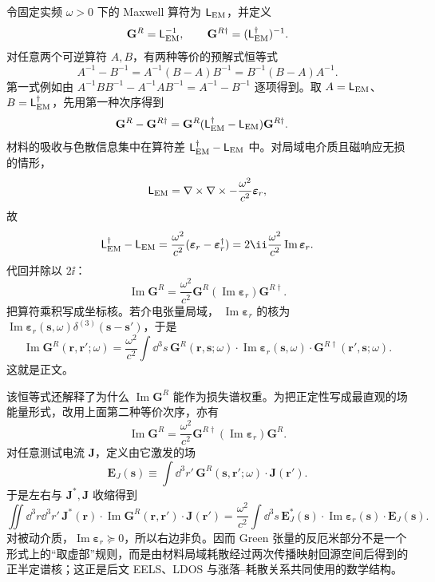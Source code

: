 \begin{derivation}
令固定实频 $\omega>0$ 下的 Maxwell 算符为 $\mathsf L_{\rm EM}$，并定义
\[
\mathbf G^R=\mathsf L_{\rm EM}^{-1},
\qquad
\mathbf G^{R\dagger}=(\mathsf L_{\rm EM}^{\dagger})^{-1}.
\]
对任意两个可逆算符 $A,B$，有两种等价的预解式恒等式
\[
A^{-1}-B^{-1}
=A^{-1}(B-A)B^{-1}
=B^{-1}(B-A)A^{-1}.
\]
第一式例如由
$A^{-1}BB^{-1}-A^{-1}AB^{-1}=A^{-1}-B^{-1}$ 逐项得到。取
$A=\mathsf L_{\rm EM}$、$B=\mathsf L_{\rm EM}^{\dagger}$，先用第一种次序得到
\begin{align*}
\mathbf G^R-\mathbf G^{R\dagger}
&=\mathbf G^R
(\mathsf L_{\rm EM}^{\dagger}-\mathsf L_{\rm EM})
\mathbf G^{R\dagger}.
\end{align*}
材料的吸收与色散信息集中在算符差 $\mathsf L_{\rm EM}^{\dagger}-\mathsf L_{\rm EM}$ 中。对局域电介质且磁响应无损的情形，
\[
\mathsf L_{\rm EM}
=\nabla\times\nabla\times
-\frac{\omega^2}{c^2}\boldsymbol\varepsilon_r,
\]
故
\[
\mathsf L_{\rm EM}^{\dagger}-\mathsf L_{\rm EM}
=\frac{\omega^2}{c^2}
(\boldsymbol\varepsilon_r-\boldsymbol\varepsilon_r^{\dagger})
=2\ii\frac{\omega^2}{c^2}
\operatorname{Im}\boldsymbol\varepsilon_r.
\]
代回并除以 $2\ii$：
\[
\operatorname{Im}\mathbf G^R
=\frac{\omega^2}{c^2}
\mathbf G^R
(\operatorname{Im}\boldsymbol\varepsilon_r)
\mathbf G^{R\dagger}.
\]
把算符乘积写成坐标核。若介电张量局域，
$\operatorname{Im}\boldsymbol\varepsilon_r$ 的核为
$\operatorname{Im}\boldsymbol\varepsilon_r(\mathbf s,\omega)
\delta^{(3)}(\mathbf s-\mathbf s')$，于是
\[
\boxed{
\operatorname{Im}\mathbf G^R(\mathbf r,\mathbf r';\omega)
=\frac{\omega^2}{c^2}\int\dd^3s\,
\mathbf G^R(\mathbf r,\mathbf s;\omega)
\cdot\operatorname{Im}\boldsymbol\varepsilon_r(\mathbf s,\omega)
\cdot\mathbf G^{R\dagger}(\mathbf r',\mathbf s;\omega)}.
\]
这就是正文。

该恒等式还解释了为什么 $\operatorname{Im}\mathbf G^R$ 能作为损失谱权重。为把正定性写成最直观的场能量形式，改用上面第二种等价次序，亦有
\[
\operatorname{Im}\mathbf G^R
=\frac{\omega^2}{c^2}
\mathbf G^{R\dagger}
(\operatorname{Im}\boldsymbol\varepsilon_r)
\mathbf G^R.
\]
对任意测试电流 $\mathbf J$，定义由它激发的场
\[
\mathbf E_J(\mathbf s)
\equiv\int\dd^3r'\,\mathbf G^R(\mathbf s,\mathbf r';\omega)\cdot\mathbf J(\mathbf r').
\]
于是左右与 $\mathbf J^*,\mathbf J$ 收缩得到
\[
\iint\dd^3r\dd^3r'\,
\mathbf J^*(\mathbf r)\cdot\operatorname{Im}\mathbf G^R(\mathbf r,\mathbf r')\cdot\mathbf J(\mathbf r')
=\frac{\omega^2}{c^2}\int\dd^3s\,
\mathbf E_J^*(\mathbf s)\cdot
\operatorname{Im}\boldsymbol\varepsilon_r(\mathbf s)\cdot\mathbf E_J(\mathbf s).
\]
对被动介质，$\operatorname{Im}\boldsymbol\varepsilon_r\succeq0$，所以右边非负。因而 Green 张量的反厄米部分不是一个形式上的“取虚部”规则，而是由材料局域耗散经过两次传播映射回源空间后得到的正半定谱核；这正是后文 EELS、LDOS 与涨落--耗散关系共同使用的数学结构。
\end{derivation}
